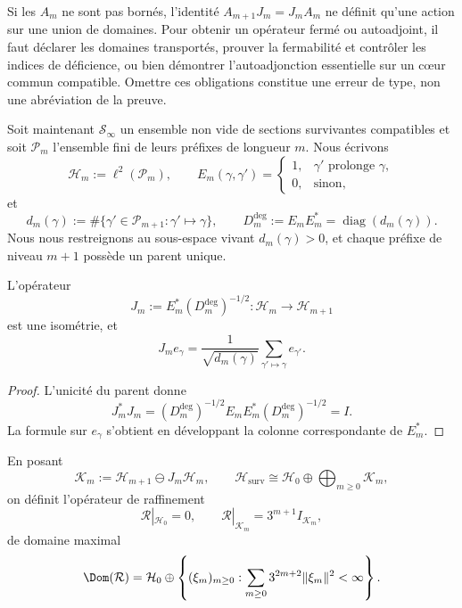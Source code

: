 \begin{remark}
\label{pf84:E03-07}
Si les \(A_m\) ne sont pas bornés, l'identité
\(A_{m+1}J_m=J_mA_m\) ne définit qu'une action sur une union de domaines.
Pour obtenir un opérateur fermé ou autoadjoint, il faut déclarer les domaines
transportés, prouver la fermabilité et contrôler les indices de
déficience, ou bien démontrer l'autoadjonction essentielle sur un cœur commun
compatible. Omettre ces obligations constitue une erreur de type, non une
abréviation de la preuve.
\end{remark}

Soit maintenant \(\mathcal S_\infty\) un ensemble non vide de sections
survivantes compatibles et soit \(\mathcal P_m\) l'ensemble fini de leurs
préfixes de longueur \(m\). Nous écrivons
\[
 \mathcal H_m:=\ell^2(\mathcal P_m),
 \qquad
 E_m(\gamma,\gamma')=
 \begin{cases}
 1,&\gamma'\text{ prolonge }\gamma,\\
 0,&\text{sinon},
 \end{cases}
\]
et
\[
 d_m(\gamma):=
 \#\{\gamma'\in\mathcal P_{m+1}:\gamma'\mapsto\gamma\},
 \qquad
 D_m^{\deg}:=E_mE_m^*=\operatorname{diag}(d_m(\gamma)).
\]
Nous nous restreignons au sous-espace vivant \(d_m(\gamma)>0\), et chaque préfixe de
niveau \(m+1\) possède un parent unique.

\begin{theorem}
\label{pf84:C01}
L'opérateur
\[
 J_m:=E_m^*(D_m^{\deg})^{-1/2}:
 \mathcal H_m\longrightarrow\mathcal H_{m+1}
\]
est une isométrie, et
\[
 J_me_\gamma=
 \frac1{\sqrt{d_m(\gamma)}}
 \sum_{\gamma'\mapsto\gamma}e_{\gamma'}.
\]
\end{theorem}

\begin{proof}
L'unicité du parent donne
\[
 J_m^*J_m
 =(D_m^{\deg})^{-1/2}E_mE_m^*(D_m^{\deg})^{-1/2}=I.
\]
La formule sur \(e_\gamma\) s'obtient en développant la colonne
correspondante de \(E_m^*\).
\end{proof}

En posant
\[
 \mathcal K_m:=\mathcal H_{m+1}\ominus J_m\mathcal H_m,
 \qquad
 \mathcal H_{\mathrm{surv}}
 \cong\mathcal H_0\oplus\bigoplus_{m\ge0}\mathcal K_m,
\]
on définit l'opérateur de raffinement
\[
 \mathcal R|_{\mathcal H_0}=0,
 \qquad
 \mathcal R|_{\mathcal K_m}=3^{m+1}I_{\mathcal K_m},
\]
de domaine maximal
\[
 \Dom(\mathcal R)=
 \mathcal H_0\oplus
 \left\{(\xi_m)_{m\ge0}:
 \sum_{m\ge0}3^{2m+2}\lVert\xi_m\rVert^2<\infty\right\}.
\]

